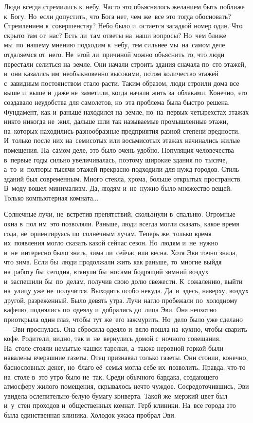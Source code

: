Люди всегда стремились к~небу.
Часто это объяснялось желанием быть поближе к~Богу.
Но~если допустить, что Бога нет, чем же~все это тогда обосновать?
Стремлением к~совершенству?
Небо было и~остается загадкой номер один.
Что скрыто там от~нас? 
Есть ли~там ответы на~наши вопросы? 
Но~чем ближе мы~по~нашему мнению подходим к~небу, тем сильнее мы~на~самом деле отдаляемся от~него.
Не~этой ли~причиной можно объяснить то, что люди перестали селиться на~земле.
Они начали строить здания сначала по~сто этажей, и~они казались им~необыкновенно высокими, потом количество этажей с~завидным постоянством стало расти.
Таким образом, люди строили дома все выше и~выше и~даже не~заметили, когда начали жить за~облаками.
Конечно, это создавало неудобства для самолетов, но~эта проблема была быстро решена.
Фундамент, как и~раньше находился на~земле, но~на~первых четырехстах этажах никто никогда не~жил, дальше шли так называемые промышленные этажи, на~которых находились разнообразные предприятия разной степени вредности.
И~только после них на~семисотых или восьмисотых этажах начинались жилые помещения.
На~самом деле, это было очень удобно.
Популяция человечества в~первые годы сильно увеличивалась, поэтому широкие здания по~тысяче, а~то~и~полторы тысячи этажей прекрасно подходили для нужд городов.
Стиль зданий был современным.
Много стекла, хрома, больше открытых пространств.
В~моду вошел минимализм.
Да, людям и~не~нужно было множество вещей.
Только компьютерная комната...

Солнечные лучи, не~встретив препятствий, скользнули в~спальню.
Огромные окна в~пол им~это позволяли.
Раньше, люди всегда могли сказать, какое время года, не~ориентируясь по~солнечным лучам.
Теперь же, только время их~появления могло сказать какой сейчас сезон.
Но~людям и~не~нужно и~не~интересно было знать, зима ли~сейчас или весна.
Хотя Эви точно знала, что зима.
Если бы~люди продолжали жить как раньше, то~многие выйдя на~работу бы~сегодня, втянули бы~носами бодрящий зимний воздух и~заспешили бы~по~делам, получив свою долю свежести.
К~сожалению, выйти на~улицу уже не~получится.
Выходить особо некуда.
Да~и~здесь, наверху, воздух другой, разреженный.
Было девять утра.
Лучи нагло пробежали по~холодному кафелю, поднялись по~одеялу и~добрались до~лица Эви.
Она неохотно приоткрыла один глаз, чтобы тут же~его зажмурить.
Но~дело было уже сделано --- Эви проснулась.
Она сбросила одеяло и~вяло пошла на~кухню, чтобы сварить кофе.
Родители, видно, так и~не~вернулись домой с~ночного совещания.
На~столе стояли немытые чашки тарелки, а~также неровной горкой были навалены вчерашние газеты.
Отец признавал только газеты.
Они стоили, конечно, баснословных денег, но~благо её~семья могла себе их~позволить.
Правда, что-то на~столе в~это утро было не~так.
Среди обычного бардака, создающего атмосферу жилого помещения, скрывалось нечто чуждое.
Сосредоточившись, Эви увидела ослепительно-белую бумагу конверта.
Такой же~мерзкий цвет был и~у~стен проходов и~общественных комнат.
Герб клиники.
На~все города это была единственная клиника.
Холодок ужаса пробрал Эви.

